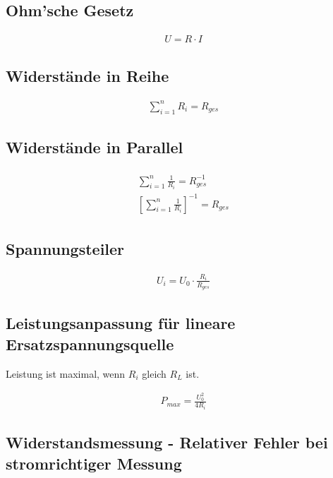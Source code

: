 \subsection*{Ohm'sche Gesetz}

\begin{align}
    U = R \cdot I
\end{align}

\subsection*{Widerstände in Reihe}

\begin{align}
    \sum_{i=1}^{n} R_i = R_{ges}
\end{align}

\subsection*{Widerstände in Parallel}

\begin{align}
    \begin{split}
        \sum_{i=1}^{n} \frac{1}{R_i} = R_{ges}^{-1} \\
        \left[ \sum_{i=1}^{n} \frac{1}{R_i} \right]^{-1} = R_{ges}
    \end{split}
\end{align}

\subsection*{Spannungsteiler}

\begin{align}
    U_i = U_0 \cdot \frac{R_i}{R_{ges}}
\end{align}

\subsection*{Leistungsanpassung für lineare Ersatzspannungsquelle}
Leistung ist maximal, wenn \(R_i\) gleich \(R_L\) ist.

\begin{align}
    P_{max} = \frac{U_0^{2}}{4R_i}
\end{align}

\subsection*{Widerstandsmessung - Relativer Fehler bei stromrichtiger Messung}

